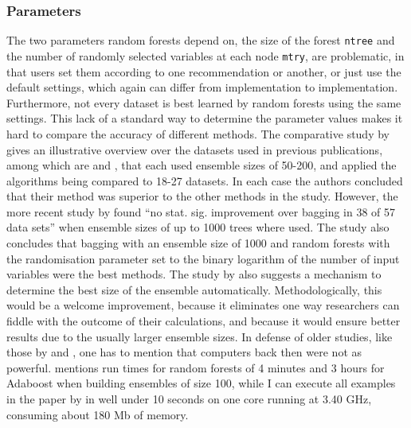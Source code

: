 \documentclass[a4paper,man,12pt,apacite,floatsintext,draftfirst]{apa6} %
\begin{document}
\subsubsection{Parameters}
The two parameters random forests depend on, the size of the forest
\texttt{ntree} and the number of randomly selected variables at each node
\texttt{mtry}, are problematic,
in that users set them according to one recommendation or another,
or just use the default settings, which again can differ from implementation
to implementation.
Furthermore, not every dataset is best learned by random forests using the
same settings.
This lack of a standard way to determine the parameter values makes it hard
to compare the accuracy of different methods.
The comparative study by  gives an
illustrative overview over the datasets used in previous publications,
among which are  and ,
that each used ensemble sizes of 50-200, and applied the algorithms being
compared to 18-27 datasets.
In each case the authors concluded that their method was superior to the
other methods in the study.
However, the more recent study by  found
“no stat. sig. improvement over bagging in 38 of 57 data sets”
when ensemble sizes of up to 1000 trees where used.
The study also concludes that bagging with an ensemble size of 1000 and
random forests with the randomisation parameter set to the
binary logarithm of the number of input variables were the best methods.
The study by  also suggests a mechanism
to determine the best size of the ensemble automatically.
Methodologically, this would be a welcome improvement, because it eliminates
one way researchers can fiddle with the outcome of their calculations,
and because it would ensure better results due to the usually larger
ensemble sizes.
In defense of older studies, like those by  and
, one has to mention that
computers back then were not as powerful.
 mentions run times for random forests of 4 minutes
and 3 hours for Adaboost when building ensembles of size 100,
while I can execute all examples in the paper by 
in well under 10 seconds on one core running at 3.40 GHz, consuming about 180 Mb
of memory.
\end{document}
